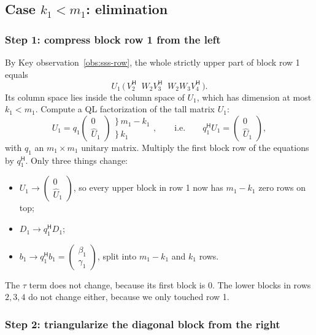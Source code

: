 \documentclass[11pt]{article}
\newcommand{\ct}{^{\mathsf H}}            %
\newcommand{\hU}{\widehat U}
\theoremstyle{definition}
\begin{document}
\subsection{\texorpdfstring{Case $k_1<m_1$: elimination}{Case k1 < m1: elimination}}

\subsubsection*{Step 1: compress block row 1 from the left}

By Key observation~\ref{obs:sss-row}, the whole strictly upper part of block row 1 equals
\[
U_1\,\bigl(\,V_2\ct \;\; W_2V_3\ct \;\; W_2W_3V_4\ct\,\bigr).
\]
Its column space lies inside the column space of $U_1$, which has dimension at
most $k_1<m_1$. Compute a QL factorization of the tall matrix $U_1$:
\[
U_1 = q_1\begin{pmatrix}0\\ \hU_1\end{pmatrix}
\begin{matrix}\}\,m_1-k_1\\ \}\,k_1\phantom{-m_1}\end{matrix},
\qquad\text{i.e.}\qquad
q_1\ct U_1 = \begin{pmatrix}0\\ \hU_1\end{pmatrix},
\]
with $q_1$ an $m_1\times m_1$ unitary matrix. Multiply the first block row of
the equations by $q_1\ct$. Only three things change:
\begin{itemize}
  \item $U_1 \to \left(\begin{smallmatrix}0\\ \hU_1\end{smallmatrix}\right)$, so every upper block in row 1
    now has $m_1-k_1$ zero rows on top;
  \item $D_1\to q_1\ct D_1$;
  \item $b_1\to q_1\ct b_1 = \left(\begin{smallmatrix}\beta_1\\ \gamma_1\end{smallmatrix}\right)$,
    split into $m_1-k_1$ and $k_1$ rows.
\end{itemize}
The $\tau$ term does not change, because its first block is $0$. The lower
blocks in rows $2,3,4$ do not change either, because we only touched row 1.

\subsubsection*{Step 2: triangularize the diagonal block from the right}
\end{document}
